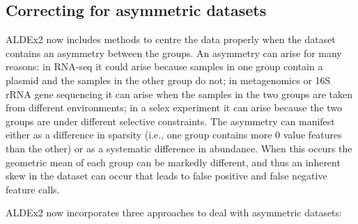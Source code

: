 \documentclass[11pt]{article}
\begin{document}
\newpage

\subsection{Correcting for asymmetric datasets}
ALDEx2 now includes methods to centre the data properly when the dataset contains an asymmetry between the groups. An asymmetry can arise for many reasons: in RNA-seq it could arise because samples in one group contain a plasmid and the samples in the other group do not; in metagenomics or 16S rRNA gene sequencing it can arise when the samples in the two groups are taken from different environments; in a selex experiment it can arise because the two groups are under different selective constraints. The asymmetry can manifest either as a difference in sparsity (i.e., one group contains more 0 value features than the other) or as a systematic difference in abundance. When this occurs the geometric mean of each group can be markedly different, and thus an inherent skew in the dataset can occur that leads to false positive and false negative feature calls.

ALDEx2 now incorporates three approaches to deal with asymmetric datasets:
\end{document}
